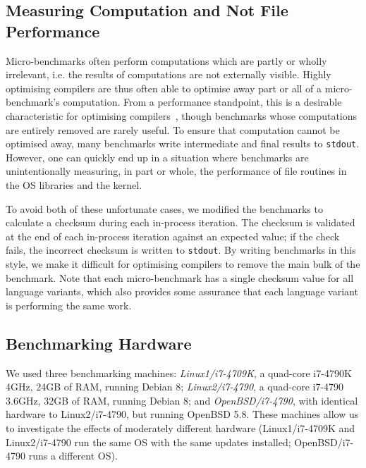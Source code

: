 \documentclass[preprint,numbers,10pt]{sigplanconf}
\newcommand{\hyptwo}{H2\xspace}
\newcommand{\bencherthree}{Linux1/i7-4709K\xspace}
\newcommand{\bencherfive}{Linux2/i7-4790\xspace}
\newcommand{\benchersix}{OpenBSD/i7-4790\xspace}
\begin{document}
\subsection{Measuring Computation and Not File Performance}

Micro-benchmarks often perform computations which are partly or wholly
irrelevant, i.e. the results of computations are not externally visible. Highly
optimising compilers are thus often able to optimise away part or all of a
micro-benchmark's computation. From a performance standpoint, this is a
desirable characteristic for
optimising compilers~\cite{seaton15phd}, though benchmarks whose computations
are entirely removed are rarely useful. To ensure that computation cannot
be optimised away, many benchmarks write intermediate and final results
to \texttt{stdout}. However, one can quickly end up in a situation where benchmarks are
unintentionally measuring, in part or whole, the performance of file routines in
the OS libraries and the kernel.

To avoid both of these unfortunate cases,
we modified the benchmarks to calculate a checksum during each in-process iteration.
The checksum is validated at the end of each in-process iteration against an expected
value; if the check fails, the incorrect checksum is written to \texttt{stdout}.
By writing benchmarks in
this style, we make it difficult for optimising compilers to remove the
main bulk of the benchmark. Note that each micro-benchmark has a single checksum value for all
language variants, which also provides some assurance that each language variant is
performing the same work.


\subsection{Benchmarking Hardware}

We used three benchmarking machines: \emph{\bencherthree}, a quad-core i7-4790K
4GHz, 24GB of RAM, running Debian 8; \emph{\bencherfive}, a quad-core i7-4790
3.6GHz, 32GB of RAM, running Debian 8; and \emph{\benchersix}, with identical
hardware to \bencherfive, but running OpenBSD 5.8. These machines allow us to
investigate the effects of moderately different hardware (\bencherthree and
\bencherfive run the same OS with the same updates installed; \benchersix runs a
different OS).
\end{document}

